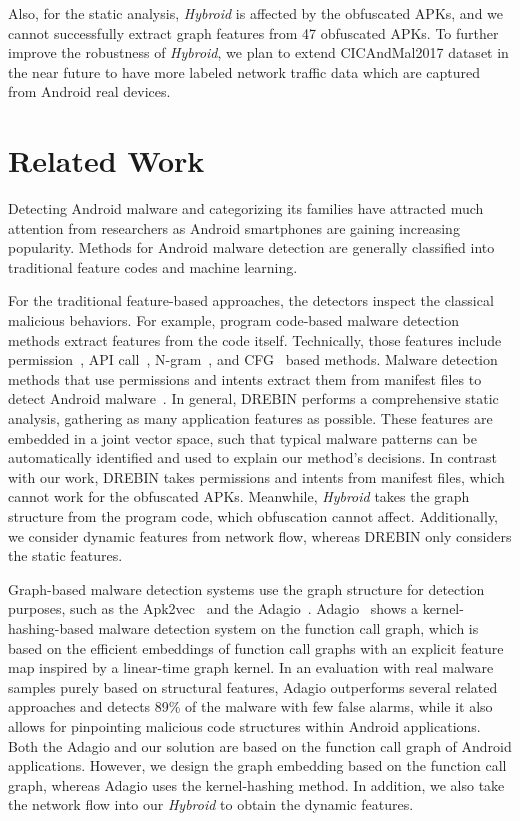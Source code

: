 \documentclass[runningheads]{llncs}
\newcommand{\toolname}{\textit{Hybroid}\xspace}
\begin{document}
Also, for the static analysis, \toolname is affected by the obfuscated APKs, and we cannot successfully extract graph features from 47 obfuscated APKs. To further improve the robustness of \toolname, we plan to extend CICAndMal2017 dataset in the near future to have more labeled network traffic data which are captured from Android real devices.



\section{Related Work}

Detecting Android malware and categorizing its families have attracted much attention from researchers as Android smartphones are gaining increasing popularity. Methods for Android malware detection are generally classified into traditional feature codes and machine learning. 

For the traditional feature-based approaches, the detectors inspect the classical malicious behaviors. For example, program code-based malware detection methods extract features from the code itself. Technically, those features include permission~\cite{arora2014malware,zulkifli2018android}, API call~\cite{afer2013droidapiminer,peiravian2013machine,zulkifli2018android,arp2014drebin}, N-gram~\cite{arp2014drebin}, and CFG~\cite{gascon2013structural} based methods. Malware detection methods that use permissions and intents extract them from manifest files to detect Android malware~\cite{arp2014drebin}. In general, DREBIN performs a comprehensive static analysis, gathering as many application features as possible. These features are embedded in a joint vector space, such that typical malware patterns can be automatically identified and used to explain our method's decisions. In contrast with our work, DREBIN takes permissions and intents from manifest files, which cannot work for the obfuscated APKs. Meanwhile, \toolname takes the graph structure from the program code, which obfuscation cannot affect. Additionally, we consider dynamic features from network flow, whereas DREBIN only considers the static features. 

Graph-based malware detection systems use the graph structure for detection purposes, such as the Apk2vec~\cite{narayanan2018apk2vec} and the Adagio~\cite{gascon2013structural}. Adagio~\cite{gascon2013structural} shows a kernel-hashing-based malware detection system on the function call graph, which is based on the efficient embeddings of function call graphs with an explicit feature map inspired by a linear-time graph kernel. In an evaluation with real malware samples purely based on structural features, Adagio outperforms several related approaches and detects 89\% of the malware with few false alarms, while it also allows for pinpointing malicious code structures within Android applications. Both the Adagio and our solution are based on the function call graph of Android applications. However, we design the graph embedding based on the function call graph, whereas Adagio uses the kernel-hashing method. In addition, we also take the network flow into our \toolname to obtain the dynamic features. 
\end{document}
